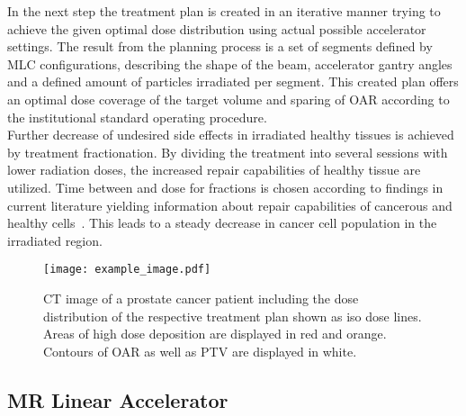 In the next step the treatment plan is created in an iterative manner trying to achieve the given optimal dose distribution using actual possible accelerator settings.
The result from the planning process is a set of segments defined by \ac{MLC} configurations, describing the shape of the beam, accelerator gantry angles and a defined amount of particles irradiated per segment.
This created plan offers an optimal dose coverage of the target volume and sparing of \ac{OAR} according to the institutional standard operating procedure.\\
Further decrease of undesired side effects in irradiated healthy tissues is achieved by treatment fractionation.
By dividing the treatment into several sessions with lower radiation doses, the increased repair capabilities of healthy tissue are utilized.
Time between and dose for fractions is chosen according to findings in current literature yielding information about repair capabilities of cancerous and healthy cells~\cite{withers_innovations_1988,barendsen_dose_1982}.
This leads to a steady decrease in cancer cell population in the irradiated region.

\begin{figure}
    \centering
    \texttt{[image: example\_image.pdf]}
    \caption{
        CT image of a prostate cancer patient including the dose distribution of the respective treatment plan shown as iso dose lines. Areas of high dose deposition are displayed in red and orange. Contours of \acs{OAR} as well as \acs{PTV} are displayed in white.
        }\label{fig:prostate_oar}
\end{figure}

\subsection{MR Linear Accelerator}

